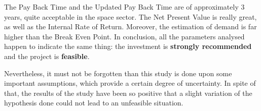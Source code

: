 The Pay Back Time and the Updated Pay Back Time are of approximately 3 years, quite acceptable in the space sector. The Net Present Value is really great, as well as the Internal Rate of Return. Moreover, the estimation of demand is far higher than the Break Even Point. In conclusion, all the parameters analysed happen to indicate the same thing: the investment is \textbf{strongly recommended} and the project is \textbf{feasible}. 

Nevertheless, it must not be forgotten than this study is done upon some important assumptions, which provide a certain degree of uncertainty. In spite of that, the results of the study have been so positive that a slight variation of the hypothesis done could not lead to an unfeasible situation. 